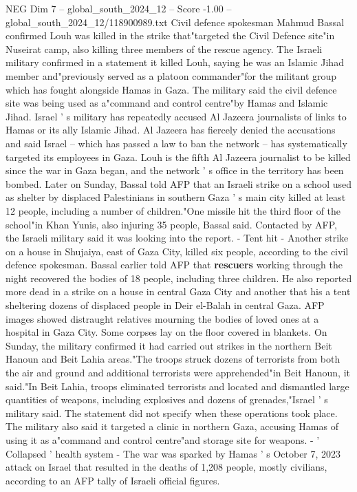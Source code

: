 \begin{textsample}{NEG Dim 7 – global\_south\_2024\_12 – Score -1.00 – global\_south\_2024\_12/118900989.txt}  \label{ex:f7_neg_106}
Civil defence spokesman Mahmud Bassal confirmed Louh was killed in the strike that"targeted the Civil Defence site"in Nuseirat camp, also killing three members of the rescue agency.
The Israeli military confirmed in a statement it killed Louh, saying he was an Islamic Jihad member and"previously served as a platoon commander"for the militant group which has fought alongside Hamas in Gaza.
The military said the civil defence site was being used as a"command and control centre"by Hamas and Islamic Jihad.
Israel ' s military has repeatedly accused Al Jazeera journalists of links to Hamas or its ally Islamic Jihad.
Al Jazeera has fiercely denied the accusations and said Israel -- which has passed a law to ban the network -- has systematically targeted its employees in Gaza.
Louh is the fifth Al Jazeera journalist to be killed since the war in Gaza began, and the network ' s office in the territory has been bombed.
Later on Sunday, Bassal told AFP that an Israeli strike on a school used as shelter by displaced Palestinians in southern Gaza ' s main city killed at least 12 people, including a number of children."One missile hit the third floor of the school"in Khan Yunis, also injuring 35 people, Bassal said.
Contacted by AFP, the Israeli military said it was looking into the report. - Tent hit - Another strike on a house in Shujaiya, east of Gaza City, killed six people, according to the civil defence spokesman.
Bassal earlier told AFP that \textbf{rescuers} working through the night recovered the bodies of 18 people, including three children.
He also reported more dead in a strike on a house in central Gaza City and another that his a tent sheltering dozens of displaced people in Deir el-Balah in central Gaza.
AFP images showed distraught relatives mourning the bodies of loved ones at a hospital in Gaza City.
Some corpses lay on the floor covered in blankets.
On Sunday, the military confirmed it had carried out strikes in the northern Beit Hanoun and Beit Lahia areas."The troops struck dozens of terrorists from both the air and ground and additional terrorists were apprehended"in Beit Hanoun, it said."In Beit Lahia, troops eliminated terrorists and located and dismantled large quantities of weapons, including explosives and dozens of grenades,"Israel ' s military said.
The statement did not specify when these operations took place.
The military also said it targeted a clinic in northern Gaza, accusing Hamas of using it as a"command and control centre"and storage site for weapons. - ' Collapsed ' health system - The war was sparked by Hamas ' s October 7, 2023 attack on Israel that resulted in the deaths of 1,208 people, mostly civilians, according to an AFP tally of Israeli official figures.

\end{textsample}
